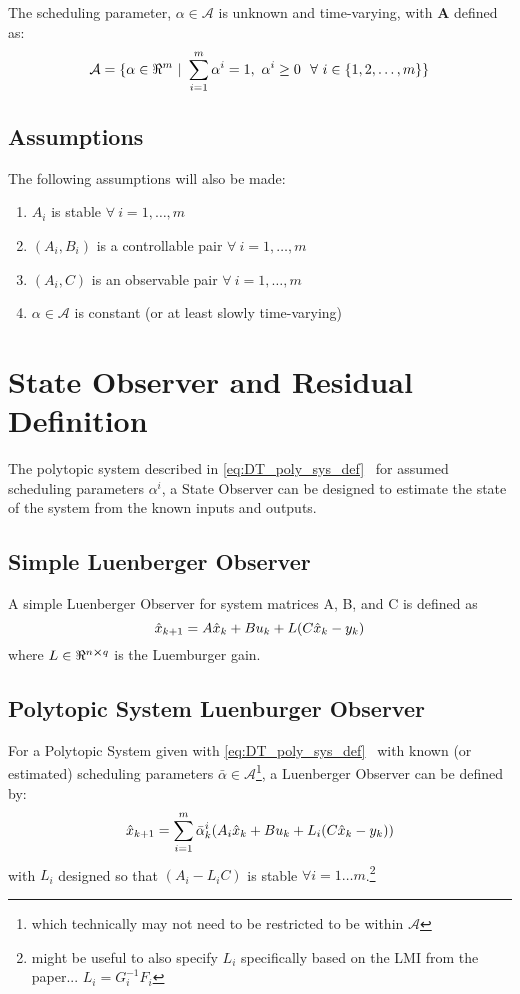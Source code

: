 \documentclass[]{article}
\begin{document}
The scheduling parameter, $\alpha \in \mathcal{A}$ is unknown and time-varying, with $\mathbf{A}$ defined as:
\begin{equation}\label{eq:alpha_set}
	\mathcal{A} = \{\alpha\in \real^m \ | \ \sum_{i=1}^m \alpha^i = 1, \ \alpha^i \geq 0 \ \ \forall \ i \in \{1,2,\dots,m\}\}
\end{equation}


\subsection{Assumptions}
The following assumptions will also be made:

\begin{enumerate}
	\item $A_i$ is stable $\forall \ i = 1, \dots, m$
	\item $(A_i, B_i)$ is a controllable pair $\forall \ i = 1, \dots, m$
	\item $(A_i, C)$ is an observable pair $\forall \ i = 1, \dots, m$
	\item $\alpha \in \mathcal{A}$ is constant (or at least slowly time-varying)
\end{enumerate}


\newpage
\section{State Observer and Residual Definition}
The polytopic system described in \eqref{eq:DT_poly_sys_def} \ for assumed scheduling parameters $\alpha^i$, a State Observer can be designed to estimate the state of the system from the known inputs and outputs.\\

\subsection{Simple Luenberger Observer}
A simple Luenberger Observer for system matrices A, B, and C is defined as
\begin{equation}\label{eq:simple_L_Observer}
	\hat{x}_{k+1} = A \hat{x}_k + B u_k + L \qty(C \hat{x}_k - y_k)
\end{equation}
where $L \in \real^{n \cross q}$ is the Luemburger gain.

\subsection{Polytopic System Luenburger Observer}
For a Polytopic System given with \eqref{eq:DT_poly_sys_def} \ with known (or estimated) scheduling parameters $\bar{\alpha} \in \mathcal{A}$\footnote{which technically may not need to be restricted to be within $\mathcal{A}$}, a Luenberger Observer can be defined by:
\begin{equation}\label{eq:DT_poly_l_observer}
	\hat{x}_{k+1} = \sum_{i=1}^m \bar{\alpha}_k^i \qty(A_i \hat{x}_k + B u_k + L_i \qty(C \hat{x}_k - y_k))
\end{equation}
with $L_i$ designed so that $(A_i - L_i C)$ is stable $\forall i = 1 \dots m$.\footnote{might be useful to also specify $L_i$ specifically based on the LMI from the paper... $L_i = G_i^{-1} F_i$}
\end{document}
